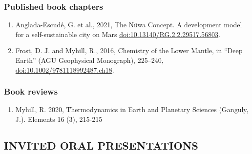 \documentclass[11pt,twoside,a4paper]{article}
\newcommand{\doi}[1]{\href{http://dx.doi.org/#1}{doi:#1}}
\begin{document}
\subsubsection*{Published book chapters}
\begin{enumerate}
 \item Anglada-Escud\'{e}, G. et al., 2021, The N\"{u}wa Concept. A development model for a self-sustainable city on Mars \doi{10.13140/RG.2.2.29517.56803}.
 \item Frost, D. J. and Myhill, R., 2016, Chemistry of the Lower Mantle, in ``Deep Earth'' (AGU Geophysical Monograph), 225--240, \doi{10.1002/9781118992487.ch18}.
\end{enumerate}

\subsubsection*{Book reviews}
\begin{enumerate}
\item Myhill, R. 2020, Thermodynamics in Earth and Planetary Sciences (Ganguly, J.). Elements 16 (3), 215-215
\end{enumerate}

\clearpage
\subsection*{INVITED ORAL PRESENTATIONS}
\end{document}
